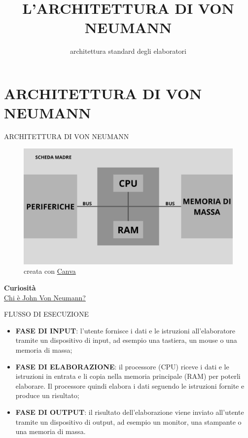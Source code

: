 \documentclass[aspectratio=1610, handout]{beamer}
\title{L'ARCHITETTURA DI VON NEUMANN}
\subtitle{architettura standard degli elaboratori}
\date{}
\institute{\textit{
        Fonti:
        \begin{itemize}
            \item[-] \href{https://it.wikipedia.org/wiki/Architettura_di_von_Neumann}{Wikipedia}
        \end{itemize}
    }
}
\begin{document}
\begin{frame}
    \titlepage
\end{frame}

\section{ARCHITETTURA DI VON NEUMANN}

\begin{frame}{ARCHITETTURA DI VON NEUMANN}
    \begin{figure}
        \includegraphics[width=\linewidth]{img/vonNeumann.png}
        \caption{{creata con \href{www.canva.com}{Canva}}}
    \end{figure}
    \tiny{\textbf{Curiosità}}\\
    \tiny{\href{https://it.wikipedia.org/wiki/John_von_Neumann}{Chi è John Von Neumann?}}
\end{frame}

\begin{frame}{FLUSSO DI ESECUZIONE}
    \begin{itemize}
        \justifying
        \item \textbf{FASE DI INPUT}: l'utente fornisce i dati e le istruzioni all'elaboratore tramite 
        un dispositivo di input, ad esempio una tastiera, un mouse o una memoria di massa;
        \pause
        \item \textbf{FASE DI ELABORAZIONE}: il processore (CPU) riceve i dati e le istruzioni in entrata 
        e li copia nella memoria principale (RAM) per poterli elaborare. Il processore quindi elabora i dati 
        seguendo le istruzioni fornite e produce un risultato;
        \pause
        \item \textbf{FASE DI OUTPUT}: il risultato dell'elaborazione viene inviato all'utente tramite 
        un dispositivo di output, ad esempio un monitor, una stampante o una memoria di massa.
    \end{itemize}
\end{frame}
\end{document}
